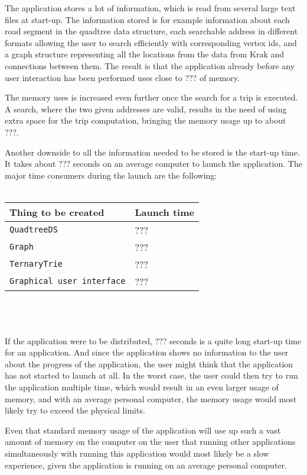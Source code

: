 The application stores a lot of information, which is read from several large text files at start-up. The information stored is for example information about each road segment in the quadtree data structure, each searchable address in different formats allowing the user to search efficiently with corresponding vertex ids, and a graph structure representing all the locations from the data from Krak and connections between them. The result is that the application already before any user interaction has been performed uses close to ??? of memory.

The memory uses is increased even further once the search for a trip is executed. A search, where the two given addresses are valid, results in the need of using extra space for the trip computation, bringing the memory usage up to about ???.

Another downside to all the information needed to be stored is the start-up time. It takes about ??? seconds on an average computer to launch the application. The major time consumers during the launch are the following: \\ \\
\begin{tabular}{ p{5cm} | p{3cm} }
	\textbf{Thing to be created} & \textbf{Launch time} \\
	\hline
	\texttt{QuadtreeDS} & ??? \\
	\texttt{Graph} & ??? \\
	\texttt{TernaryTrie} & ??? \\
	\texttt{Graphical user interface} & ???
\end{tabular}
\\ \\ \\
If the application were to be distributed, ??? seconds is a quite long start-up time for an application. And since the application shows no information to the user about the progress of the application, the user might think that the application has not started to launch at all. In the worst case, the user could then try to run the application multiple time, which would result in an even larger usage of memory, and with an average personal computer, the memory usage would most likely try to exceed the physical limits.

Even that standard memory usage of the application will use up such a vast amount of memory on the computer on the user that running other applications simultaneously with running this application would most likely be a slow experience, given the application is running on an average personal computer.

